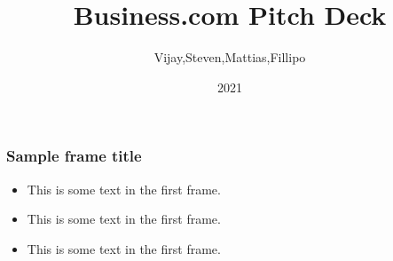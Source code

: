 \documentclass{beamer}
\title{Business.com Pitch Deck}
\author{Vijay,Steven,Mattias,Fillipo}
\institute{Overleaf}
\date{2021}
\begin{document}
\frame{\titlepage}

\begin{frame}
\frametitle{Sample frame title}
\begin{itemize}
  \item This is some text in the first frame.
  \item This is some text in the first frame.
  \item This is some text in the first frame.
\end{itemize}
\end{frame}

\end{document}
